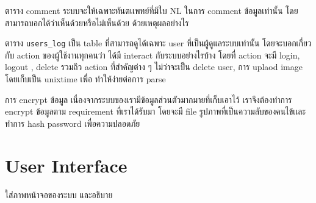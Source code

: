 ตาราง comment ระบบจะให้เฉพาะทันตเเพทย์ที่มีใบ NL ในการ comment ข้อมูลเท่านั้น โดยสามารถบอกได้ว่าเห็นด้วยหรือไม่เห็นด้วย ด้วยเหตุผลอย่างไร 

ตาราง \texttt{users\_log} เป็น table ที่สามารถดูได้เฉพาะ user ที่เป็นผู้ดูแลระบบเท่านั้น 
โดยจะบอกเกี่ยวกับ action ของผู้ใช้งานทุกคนว่า ได้มี interact กับระบบอย่างไรบ้าง โดยที่ action จะมี login, logout , delete รวมถึว action ที่สำคัญต่าง ๆ ไม่ว่าจะเป็น delete user, การ uplaod image โดยเก็บเป็น unixtime เพื่อ ทำให้ง่ายต่อการ parse

การ encrypt ข้อมูล  เนื่องจากระบบของเรามีข้อมูลส่วนตัวมากมายที่เก็บเอาไว้ เราจึงต้องทำการ encrypt ข้อมูลตาม requirement ที่เราได้รับมา โดยจะมี file รูปภาพที่เป็นความลับของคนไข้เเละทำการ hash password เพื่อความปลอดภัย

\section{User Interface}
ใส่ภาพหน้าจอของระบบ และอธิบาย